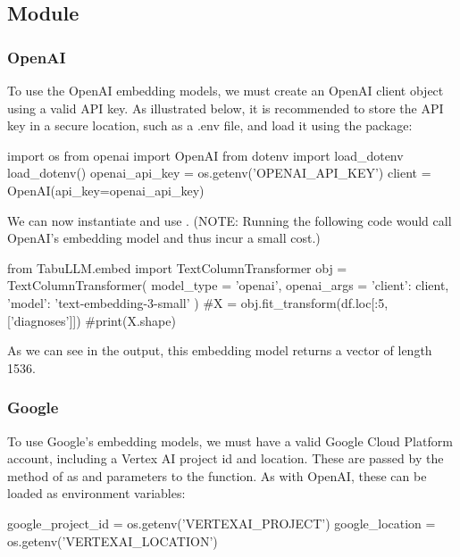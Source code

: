 \documentclass[article]{jss}
\begin{document}
\subsection[embed Module]{ Module}\label{subsec:using-embed}

\subsubsection{OpenAI}\label{subsubsec:using-embed-openai}

To use the OpenAI embedding models, we must create an OpenAI client object using a valid API key. As illustrated below, it is recommended to store the API key in a secure location, such as a .env file, and load it using the  package:
\begin{pyblock}
import os
from openai import OpenAI
from dotenv import load_dotenv
load_dotenv()
openai_api_key = os.getenv('OPENAI_API_KEY')
client = OpenAI(api_key=openai_api_key)
\end{pyblock}
We can now instantiate and use . (NOTE: Running the following code would call OpenAI's embedding model and thus incur a small cost.)
\begin{pyblock}
from TabuLLM.embed import TextColumnTransformer
obj = TextColumnTransformer(
  model_type = 'openai',
  openai_args = {
    'client': client, 
    'model': 'text-embedding-3-small'
  }
)
#X = obj.fit_transform(df.loc[:5, ['diagnoses']])
#print(X.shape)
\end{pyblock}

As we can see in the output, this embedding model returns a vector of length 1536.

\subsubsection{Google}\label{subsubsec:using-embed-google}

To use Google's embedding models, we must have a valid Google Cloud Platform account, including a Vertex AI project id and location. These are passed by the  method of  as  and  parameters to the  function. As with OpenAI, these can be loaded as environment variables:
\begin{pyblock}
google_project_id = os.getenv('VERTEXAI_PROJECT')
google_location = os.getenv('VERTEXAI_LOCATION')
\end{pyblock}
\end{document}
